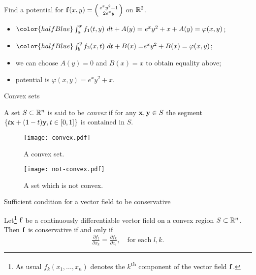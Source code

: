 \begin{example}
    Find a potential for \(\mathbf{f}(x,y) = \left(\begin{smallmatrix}
        e^x y^2 + 1\\ 2e^x y
    \end{smallmatrix}\right)\) on \(\mathbb{R}^2\).
    \begin{itemize}
        \item \({\color{halfBlue} \int_{a}^{x} f_1(t,y) \ dt + A(y) = } \ e^x y^2 + x + A(y) = \varphi(x,y)\);
        \item \( {\color{halfBlue} \int_{b}^{y} f_2(x,t) \ dt + B(x) = }  e^x y^2 + B(x) = \varphi(x,y) \);
        \item we can choose \(A(y) = 0\) and \(B(x)=x\) to obtain equality above;
        \item potential is \(\varphi(x,y) = e^x y^2 + x\).
    \end{itemize}
\end{example}




{Convex sets}


\begin{definition}
    A set \(S\subset \mathbb{R}^n\) is said to be \emph{convex} if for any \(\mathbf{x},\mathbf{y}\in S\) the segment \(\{t\mathbf{x} + (1-t)\mathbf{y}, t\in[0,1]\}\) is contained in \(S\).
\end{definition}



\begin{figure}
    \centering
    \texttt{[image: convex.pdf]}
    \caption{A convex set.}
\end{figure}


\begin{figure}
    \centering
    \texttt{[image: not-convex.pdf]}
    \caption{A set which is not convex.}
\end{figure}

{Sufficient condition for a vector field to be conservative}


\begin{theorem}
    Let\footnote{As usual  \(  f_k(x_1,\ldots,x_n)\) denotes the \(k\)\textsuperscript{th} component of the vector field \(\mathbf{f}\).} \(\mathbf{f}\) be a continuously differentiable vector field on a convex region \(S\subset \mathbb{R}^n\).
    Then \(\mathbf{f}\) is conservative if and only if
    \[
        \tfrac{\partial f_l}{\partial x_k} = \tfrac{\partial f_k}{\partial x_l},
        \quad \text{for each \(l,k\)}.
    \]
\end{theorem}




